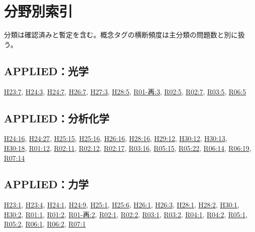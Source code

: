 \chapter{分野別索引}
分類は確認済みと暫定を含む。概念タグの横断頻度は主分類の問題数と別に扱う。
\section{APPLIED：光学}
\hyperref[q:h23-reg-applied-07]{H23:7}, \hyperref[q:h24-reg-applied-03]{H24:3}, \hyperref[q:h24-reg-applied-07]{H24:7}, \hyperref[q:h26-reg-applied-07]{H26:7}, \hyperref[q:h27-reg-applied-03]{H27:3}, \hyperref[q:h28-reg-applied-05]{H28:5}, \hyperref[q:r01-ret-applied-03]{R01-再:3}, \hyperref[q:r02-reg-applied-05]{R02:5}, \hyperref[q:r02-reg-applied-07]{R02:7}, \hyperref[q:r03-reg-applied-05]{R03:5}, \hyperref[q:r06-reg-applied-05]{R06:5}
\section{APPLIED：分析化学}
\hyperref[q:h24-reg-applied-16]{H24:16}, \hyperref[q:h24-reg-applied-27]{H24:27}, \hyperref[q:h25-reg-applied-15]{H25:15}, \hyperref[q:h25-reg-applied-16]{H25:16}, \hyperref[q:h26-reg-applied-16]{H26:16}, \hyperref[q:h28-reg-applied-16]{H28:16}, \hyperref[q:h29-reg-applied-12]{H29:12}, \hyperref[q:h30-reg-applied-12]{H30:12}, \hyperref[q:h30-reg-applied-13]{H30:13}, \hyperref[q:h30-reg-applied-18]{H30:18}, \hyperref[q:r01-reg-applied-12]{R01:12}, \hyperref[q:r02-reg-applied-11]{R02:11}, \hyperref[q:r02-reg-applied-12]{R02:12}, \hyperref[q:r02-reg-applied-17]{R02:17}, \hyperref[q:r03-reg-applied-16]{R03:16}, \hyperref[q:r05-reg-applied-15]{R05:15}, \hyperref[q:r05-reg-applied-22]{R05:22}, \hyperref[q:r06-reg-applied-14]{R06:14}, \hyperref[q:r06-reg-applied-19]{R06:19}, \hyperref[q:r07-reg-applied-14]{R07:14}
\section{APPLIED：力学}
\hyperref[q:h23-reg-applied-01]{H23:1}, \hyperref[q:h23-reg-applied-04]{H23:4}, \hyperref[q:h24-reg-applied-01]{H24:1}, \hyperref[q:h24-reg-applied-09]{H24:9}, \hyperref[q:h25-reg-applied-01]{H25:1}, \hyperref[q:h25-reg-applied-06]{H25:6}, \hyperref[q:h26-reg-applied-01]{H26:1}, \hyperref[q:h26-reg-applied-03]{H26:3}, \hyperref[q:h28-reg-applied-01]{H28:1}, \hyperref[q:h28-reg-applied-02]{H28:2}, \hyperref[q:h30-reg-applied-01]{H30:1}, \hyperref[q:h30-reg-applied-02]{H30:2}, \hyperref[q:r01-reg-applied-01]{R01:1}, \hyperref[q:r01-reg-applied-02]{R01:2}, \hyperref[q:r01-ret-applied-02]{R01-再:2}, \hyperref[q:r02-reg-applied-01]{R02:1}, \hyperref[q:r02-reg-applied-02]{R02:2}, \hyperref[q:r03-reg-applied-01]{R03:1}, \hyperref[q:r03-reg-applied-02]{R03:2}, \hyperref[q:r04-reg-applied-01]{R04:1}, \hyperref[q:r04-reg-applied-02]{R04:2}, \hyperref[q:r05-reg-applied-01]{R05:1}, \hyperref[q:r05-reg-applied-02]{R05:2}, \hyperref[q:r06-reg-applied-01]{R06:1}, \hyperref[q:r06-reg-applied-02]{R06:2}, \hyperref[q:r07-reg-applied-01]{R07:1}
